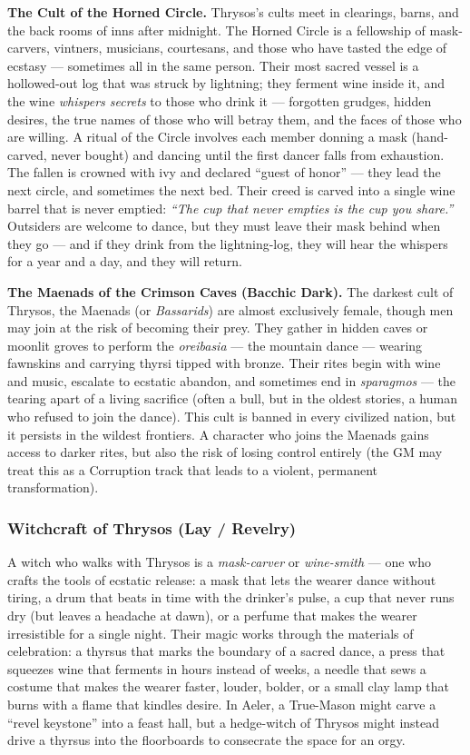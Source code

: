 \textbf{The Cult of the Horned Circle.} Thrysos's cults meet in clearings, barns, and the back rooms of inns after midnight. The Horned Circle is a fellowship of mask-carvers, vintners, musicians, courtesans, and those who have tasted the edge of ecstasy --- sometimes all in the same person. Their most sacred vessel is a hollowed-out log that was struck by lightning; they ferment wine inside it, and the wine \textit{whispers secrets} to those who drink it --- forgotten grudges, hidden desires, the true names of those who will betray them, and the faces of those who are willing. A ritual of the Circle involves each member donning a mask (hand-carved, never bought) and dancing until the first dancer falls from exhaustion. The fallen is crowned with ivy and declared ``guest of honor'' --- they lead the next circle, and sometimes the next bed. Their creed is carved into a single wine barrel that is never emptied: \textit{``The cup that never empties is the cup you share.''} Outsiders are welcome to dance, but they must leave their mask behind when they go --- and if they drink from the lightning-log, they will hear the whispers for a year and a day, and they will return.

\textbf{The Maenads of the Crimson Caves (Bacchic Dark).} The darkest cult of Thrysos, the Maenads (or \textit{Bassarids}) are almost exclusively female, though men may join at the risk of becoming their prey. They gather in hidden caves or moonlit groves to perform the \textit{oreibasia} --- the mountain dance --- wearing fawnskins and carrying thyrsi tipped with bronze. Their rites begin with wine and music, escalate to ecstatic abandon, and sometimes end in \textit{sparagmos} --- the tearing apart of a living sacrifice (often a bull, but in the oldest stories, a human who refused to join the dance). This cult is banned in every civilized nation, but it persists in the wildest frontiers. A character who joins the Maenads gains access to darker rites, but also the risk of losing control entirely (the GM may treat this as a Corruption track that leads to a violent, permanent transformation).

\subsubsection*{Witchcraft of Thrysos (Lay / Revelry)}

A witch who walks with Thrysos is a \textit{mask-carver} or \textit{wine-smith} --- one who crafts the tools of ecstatic release: a mask that lets the wearer dance without tiring, a drum that beats in time with the drinker's pulse, a cup that never runs dry (but leaves a headache at dawn), or a perfume that makes the wearer irresistible for a single night. Their magic works through the materials of celebration: a thyrsus that marks the boundary of a sacred dance, a press that squeezes wine that ferments in hours instead of weeks, a needle that sews a costume that makes the wearer faster, louder, bolder, or a small clay lamp that burns with a flame that kindles desire. In Aeler, a True-Mason might carve a ``revel keystone'' into a feast hall, but a hedge-witch of Thrysos might instead drive a thyrsus into the floorboards to consecrate the space for an orgy.

